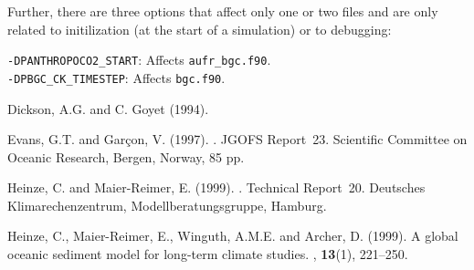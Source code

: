 \documentclass[11pt,a4paper,fleqn,twoside]{article}
\begin{document}
\begin{appendix}
\vspace{.2cm}
Further, there are three options that affect only one or two files and are only
related to initilization (at the start of a simulation) or to debugging:

\footnotesize
{\tt -DPANTHROPOCO2\_START}: Affects {\tt aufr\_bgc.f90}.\\
{\tt -DPBGC\_CK\_TIMESTEP}: Affects {\tt bgc.f90}.\\
\normalsize



\end{appendix}

\clearpage

\newpage 
\begin{thebibliography}{}





Dickson, A.G. and C. Goyet (1994).

Evans, G.T. and Gar\c{c}on, V. (1997).
.
\newblock JGOFS Report~23. Scientific Committee on Oceanic Research, Bergen,
  Norway, 85 pp.

Heinze, C. and Maier-Reimer, E. (1999).
.
\newblock Technical Report~20. Deutsches Klimarechenzentrum,
  Modellberatungsgruppe, Hamburg.

Heinze, C., Maier-Reimer, E., Winguth, A.M.E. and Archer, D. (1999).
\newblock A global oceanic sediment model for long-term climate studies.
, {\bf 13}(1), 221--250.


\end{thebibliography}
\end{document}
